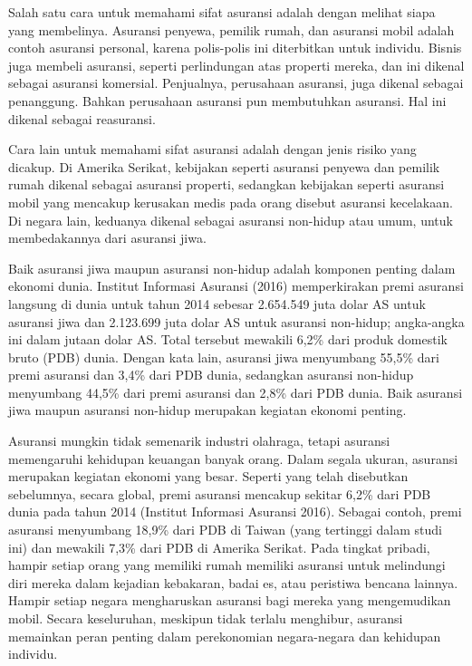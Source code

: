 \documentclass[
]{book}
\begin{document}
Salah satu cara untuk memahami sifat asuransi adalah dengan melihat siapa yang membelinya. Asuransi penyewa, pemilik rumah, dan asuransi mobil adalah contoh asuransi personal, karena polis-polis ini diterbitkan untuk individu. Bisnis juga membeli asuransi, seperti perlindungan atas properti mereka, dan ini dikenal sebagai asuransi komersial. Penjualnya, perusahaan asuransi, juga dikenal sebagai penanggung. Bahkan perusahaan asuransi pun membutuhkan asuransi. Hal ini dikenal sebagai reasuransi.

Cara lain untuk memahami sifat asuransi adalah dengan jenis risiko yang dicakup. Di Amerika Serikat, kebijakan seperti asuransi penyewa dan pemilik rumah dikenal sebagai asuransi properti, sedangkan kebijakan seperti asuransi mobil yang mencakup kerusakan medis pada orang disebut asuransi kecelakaan. Di negara lain, keduanya dikenal sebagai asuransi non-hidup atau umum, untuk membedakannya dari asuransi jiwa.

Baik asuransi jiwa maupun asuransi non-hidup adalah komponen penting dalam ekonomi dunia. Institut Informasi Asuransi (2016) memperkirakan premi asuransi langsung di dunia untuk tahun 2014 sebesar 2.654.549 juta dolar AS untuk asuransi jiwa dan 2.123.699 juta dolar AS untuk asuransi non-hidup; angka-angka ini dalam jutaan dolar AS. Total tersebut mewakili 6,2\% dari produk domestik bruto (PDB) dunia. Dengan kata lain, asuransi jiwa menyumbang 55,5\% dari premi asuransi dan 3,4\% dari PDB dunia, sedangkan asuransi non-hidup menyumbang 44,5\% dari premi asuransi dan 2,8\% dari PDB dunia. Baik asuransi jiwa maupun asuransi non-hidup merupakan kegiatan ekonomi penting.

Asuransi mungkin tidak semenarik industri olahraga, tetapi asuransi memengaruhi kehidupan keuangan banyak orang. Dalam segala ukuran, asuransi merupakan kegiatan ekonomi yang besar. Seperti yang telah disebutkan sebelumnya, secara global, premi asuransi mencakup sekitar 6,2\% dari PDB dunia pada tahun 2014 (Institut Informasi Asuransi 2016). Sebagai contoh, premi asuransi menyumbang 18,9\% dari PDB di Taiwan (yang tertinggi dalam studi ini) dan mewakili 7,3\% dari PDB di Amerika Serikat. Pada tingkat pribadi, hampir setiap orang yang memiliki rumah memiliki asuransi untuk melindungi diri mereka dalam kejadian kebakaran, badai es, atau peristiwa bencana lainnya. Hampir setiap negara mengharuskan asuransi bagi mereka yang mengemudikan mobil. Secara keseluruhan, meskipun tidak terlalu menghibur, asuransi memainkan peran penting dalam perekonomian negara-negara dan kehidupan individu.
\end{document}
